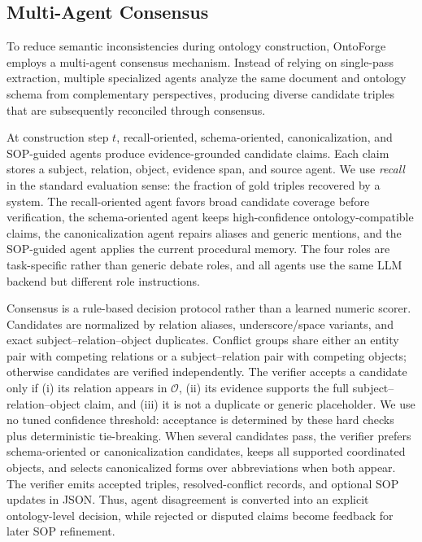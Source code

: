 \documentclass[sigconf]{acmart}
\begin{document}
\subsection{Multi-Agent Consensus}

To reduce semantic inconsistencies during ontology construction, OntoForge employs a multi-agent consensus mechanism. Instead of relying on single-pass extraction, multiple specialized agents analyze the same document and ontology schema from complementary perspectives, producing diverse candidate triples that are subsequently reconciled through consensus.

At construction step $t$, recall-oriented, schema-oriented, canonicalization, and SOP-guided agents produce evidence-grounded candidate claims. Each claim stores a subject, relation, object, evidence span, and source agent. We use \textit{recall} in the standard evaluation sense: the fraction of gold triples recovered by a system. The recall-oriented agent favors broad candidate coverage before verification, the schema-oriented agent keeps high-confidence ontology-compatible claims, the canonicalization agent repairs aliases and generic mentions, and the SOP-guided agent applies the current procedural memory. The four roles are task-specific rather than generic debate roles, and all agents use the same LLM backend but different role instructions.

Consensus is a rule-based decision protocol rather than a learned numeric scorer. Candidates are normalized by relation aliases, underscore/space variants, and exact subject--relation--object duplicates. Conflict groups share either an entity pair with competing relations or a subject--relation pair with competing objects; otherwise candidates are verified independently. The verifier accepts a candidate only if (i) its relation appears in $\mathcal{O}$, (ii) its evidence supports the full subject--relation--object claim, and (iii) it is not a duplicate or generic placeholder. We use no tuned confidence threshold: acceptance is determined by these hard checks plus deterministic tie-breaking. When several candidates pass, the verifier prefers schema-oriented or canonicalization candidates, keeps all supported coordinated objects, and selects canonicalized forms over abbreviations when both appear. The verifier emits accepted triples, resolved-conflict records, and optional SOP updates in JSON. Thus, agent disagreement is converted into an explicit ontology-level decision, while rejected or disputed claims become feedback for later SOP refinement.
\end{document}
